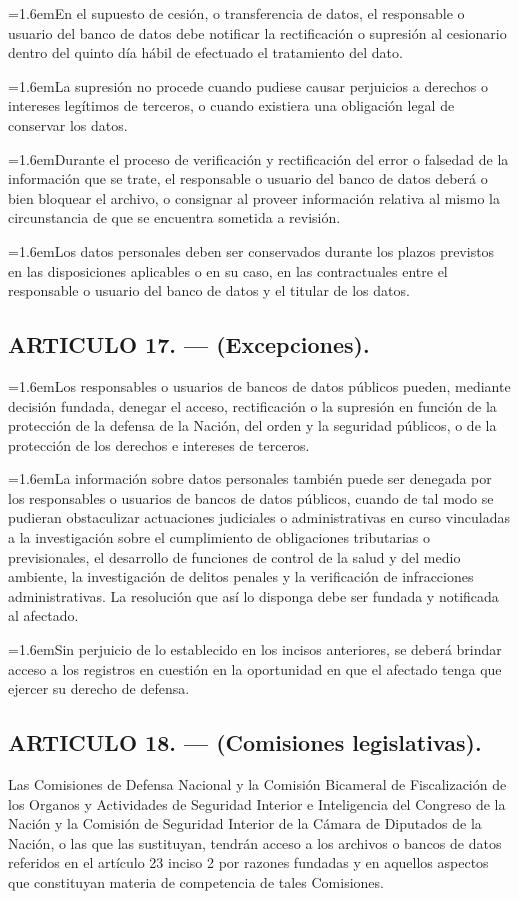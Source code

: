 \documentclass[10pt,a4paper]{article}
\newcommand{\articulo}[1]{\subsection{#1}}
\newcommand{\inciso}[2]{\par{\hangindent=1.6em\hangafter=1\makebox[1.6em][l]{#1}#2\par}}
\begin{document}
\inciso{4.}{En el supuesto de cesión, o transferencia de datos, el responsable o usuario del banco de datos debe notificar la rectificación o supresión al cesionario dentro del quinto día hábil de efectuado el tratamiento del dato.}

\inciso{5.}{La supresión no procede cuando pudiese causar perjuicios a derechos o intereses legítimos de terceros, o cuando existiera una obligación legal de conservar los datos.}

\inciso{6.}{Durante el proceso de verificación y rectificación del error o falsedad de la información que se trate, el responsable o usuario del banco de datos deberá o bien bloquear el archivo, o consignar al proveer información relativa al mismo la circunstancia de que se encuentra sometida a revisión.}

\inciso{7.}{Los datos personales deben ser conservados durante los plazos previstos en las disposiciones aplicables o en su caso, en las contractuales entre el responsable o usuario del banco de datos y el titular de los datos.}

\articulo{ARTICULO 17. — (Excepciones).}
\inciso{1.}{Los responsables o usuarios de bancos de datos públicos pueden, mediante decisión fundada, denegar el acceso, rectificación o la supresión en función de la protección de la defensa de la Nación, del orden y la seguridad públicos, o de la protección de los derechos e intereses de terceros.}

\inciso{2.}{La información sobre datos personales también puede ser denegada por los responsables o usuarios de bancos de datos públicos, cuando de tal modo se pudieran obstaculizar actuaciones judiciales o administrativas en curso vinculadas a la investigación sobre el cumplimiento de obligaciones tributarias o previsionales, el desarrollo de funciones de control de la salud y del medio ambiente, la investigación de delitos penales y la verificación de infracciones administrativas. La resolución que así lo disponga debe ser fundada y notificada al afectado.}

\inciso{3.}{Sin perjuicio de lo establecido en los incisos anteriores, se deberá brindar acceso a los registros en cuestión en la oportunidad en que el afectado tenga que ejercer su derecho de defensa.}

\articulo{ARTICULO 18. — (Comisiones legislativas).}
Las Comisiones de Defensa Nacional y la Comisión Bicameral de Fiscalización de los Organos y Actividades de Seguridad Interior e Inteligencia del Congreso de la Nación y la Comisión de Seguridad Interior de la Cámara de Diputados de la Nación, o las que las sustituyan, tendrán acceso a los archivos o bancos de datos referidos en el artículo 23 inciso 2 por razones fundadas y en aquellos aspectos que constituyan materia de competencia de tales Comisiones.
\end{document}
